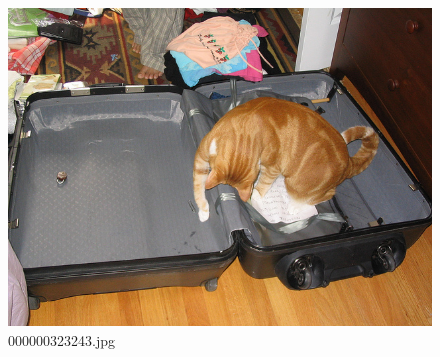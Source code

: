     \begin{figure}[h]
        \centering
        \includegraphics[width=0.8\linewidth]{../image set/easy/000000323243.jpg}
        \caption{000000323243.jpg}
    \end{figure}

